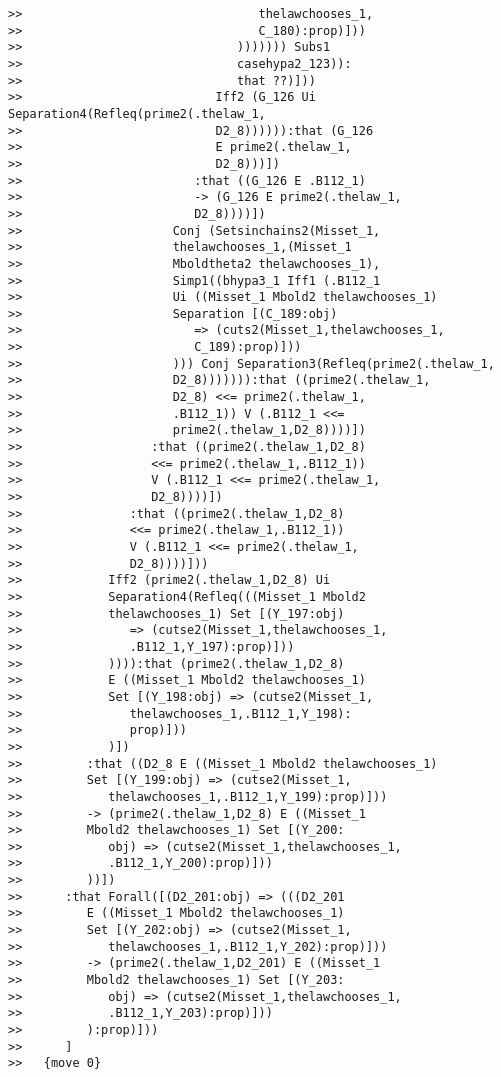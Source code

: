 \documentclass[12pt]{article}
\begin{document}
\begin{verbatim}
>>                                 thelawchooses_1,
>>                                 C_180):prop)]))
>>                              ))))))) Subs1
>>                              casehypa2_123)):
>>                              that ??)]))
>>                           Iff2 (G_126 Ui Separation4(Refleq(prime2(.thelaw_1,
>>                           D2_8)))))):that (G_126
>>                           E prime2(.thelaw_1,
>>                           D2_8)))])
>>                        :that ((G_126 E .B112_1)
>>                        -> (G_126 E prime2(.thelaw_1,
>>                        D2_8))))])
>>                     Conj (Setsinchains2(Misset_1,
>>                     thelawchooses_1,(Misset_1
>>                     Mboldtheta2 thelawchooses_1),
>>                     Simp1((bhypa3_1 Iff1 (.B112_1
>>                     Ui ((Misset_1 Mbold2 thelawchooses_1)
>>                     Separation [(C_189:obj)
>>                        => (cuts2(Misset_1,thelawchooses_1,
>>                        C_189):prop)]))
>>                     ))) Conj Separation3(Refleq(prime2(.thelaw_1,
>>                     D2_8))))))):that ((prime2(.thelaw_1,
>>                     D2_8) <<= prime2(.thelaw_1,
>>                     .B112_1)) V (.B112_1 <<=
>>                     prime2(.thelaw_1,D2_8))))])
>>                  :that ((prime2(.thelaw_1,D2_8)
>>                  <<= prime2(.thelaw_1,.B112_1))
>>                  V (.B112_1 <<= prime2(.thelaw_1,
>>                  D2_8))))])
>>               :that ((prime2(.thelaw_1,D2_8)
>>               <<= prime2(.thelaw_1,.B112_1))
>>               V (.B112_1 <<= prime2(.thelaw_1,
>>               D2_8))))]))
>>            Iff2 (prime2(.thelaw_1,D2_8) Ui
>>            Separation4(Refleq(((Misset_1 Mbold2
>>            thelawchooses_1) Set [(Y_197:obj)
>>               => (cutse2(Misset_1,thelawchooses_1,
>>               .B112_1,Y_197):prop)]))
>>            )))):that (prime2(.thelaw_1,D2_8)
>>            E ((Misset_1 Mbold2 thelawchooses_1)
>>            Set [(Y_198:obj) => (cutse2(Misset_1,
>>               thelawchooses_1,.B112_1,Y_198):
>>               prop)]))
>>            )])
>>         :that ((D2_8 E ((Misset_1 Mbold2 thelawchooses_1)
>>         Set [(Y_199:obj) => (cutse2(Misset_1,
>>            thelawchooses_1,.B112_1,Y_199):prop)]))
>>         -> (prime2(.thelaw_1,D2_8) E ((Misset_1
>>         Mbold2 thelawchooses_1) Set [(Y_200:
>>            obj) => (cutse2(Misset_1,thelawchooses_1,
>>            .B112_1,Y_200):prop)]))
>>         ))])
>>      :that Forall([(D2_201:obj) => (((D2_201
>>         E ((Misset_1 Mbold2 thelawchooses_1)
>>         Set [(Y_202:obj) => (cutse2(Misset_1,
>>            thelawchooses_1,.B112_1,Y_202):prop)]))
>>         -> (prime2(.thelaw_1,D2_201) E ((Misset_1
>>         Mbold2 thelawchooses_1) Set [(Y_203:
>>            obj) => (cutse2(Misset_1,thelawchooses_1,
>>            .B112_1,Y_203):prop)]))
>>         ):prop)]))
>>      ]
>>   {move 0}



\end{verbatim}
\end{document}
